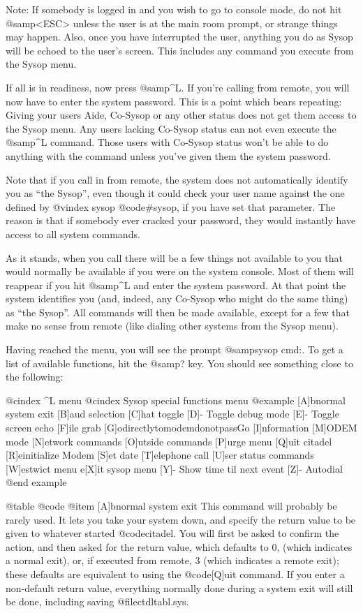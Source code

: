 Note: If somebody is logged in and you wish to go to console mode,
do not hit @samp{<ESC>} unless the user is at the main room prompt, or strange
things may happen.  Also, once you have interrupted the user, anything you
do as Sysop will be echoed to the user's screen.  This includes any command
you execute from the Sysop menu.

If all is in readiness, now press @samp{^L}.  If you're calling from
remote, you will now have to enter the system password.  This is a point which
bears repeating:  Giving your users Aide, Co-Sysop or any other status does not
get them access to the Sysop menu.  Any users lacking Co-Sysop status can not
even execute the @samp{^L} command.  Those users with Co-Sysop status won't be
able to do anything with the command unless you've given them the system password.

Note that if you call in from remote, the system does not automatically identify
you as ``the Sysop'', even though it could check your user name against the one
defined by
@vindex sysop
@code{#sysop}, if you have set that parameter.  The reason is that if
somebody ever cracked your password, they would instantly have access to all
system commands.

As it stands, when you call there will be a few things not
available to you that would normally be available if you were on the system
console.  Most of them will reappear if you hit @samp{^L} and enter the system
password.  At that point the system identifies you (and, indeed, any Co-Sysop
who might do the same thing) as ``the Sysop''.  All commands will then be
made available, except for a few that make no sense from remote (like dialing
other systems from the Sysop menu).

Having reached the menu, you will see the prompt @samp{sysop cmd:}.  To get
a list of available functions, hit the @samp{?} key.  You should see something
close to the following:

@cindex ^L menu
@cindex Sysop special functions menu
@example
[A]bnormal system exit
[B]aud selection
[C]hat toggle
[D]- Toggle debug mode
[E]- Toggle screen echo
[F]ile grab
[G]odirectlytomodemdonotpassGo
[I]nformation
[M]ODEM mode
[N]etwork commands
[O]utside commands
[P]urge menu
[Q]uit citadel
[R]einitialize Modem
[S]et date
[T]elephone call
[U]ser status commands
[W]estwict menu
e[X]it sysop menu
[Y]- Show time til next event
[Z]- Autodial
@end example

@table @code
@item [A]bnormal system exit
This command will probably be rarely used.  It lets you take
your system down, and specify the return value to be given to whatever
started @code{citadel}.  You will first be asked to confirm the action,
and then asked for the return value, which defaults to 0, (which
indicates a normal exit), or, if executed from remote, 3 (which
indicates a remote exit); these defaults are equivalent to using the
@code{[Q]uit} command.  If you enter a non-default return value,
everything normally done during a system exit will still be done, including
saving @file{ctdltabl.sys}.


